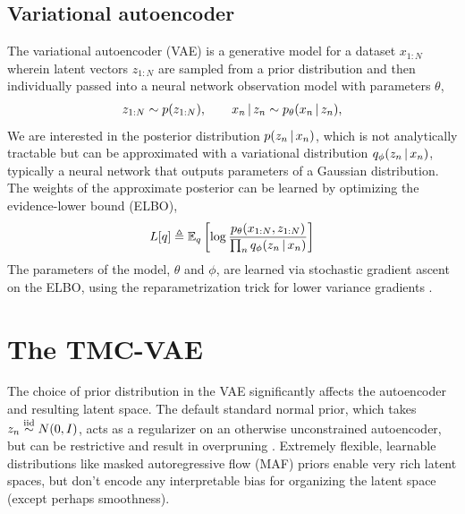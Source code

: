 \subsection{Variational autoencoder}
The variational autoencoder (VAE) is a generative model
for a dataset $x_{1:N}$
wherein latent vectors $z_{1:N}$ are sampled
from a prior distribution
and then individually passed into
a neural network observation model with parameters $\theta$,
\begin{equation}
    \begin{split}
        z_{1:N} \sim p(z_{1:N}),
        \qquad
        x_n \,|\, z_n \sim p_\theta(x_n \,|\, z_n),
    \end{split}
\end{equation}
We are interested in the posterior distribution
$p(z_n \,|\, x_n)$, which is not analytically tractable
but can be approximated with a variational distribution
$q_\phi(z_n \,|\, x_n)$, typically a neural network
that outputs parameters of a Gaussian distribution.
The weights of the approximate posterior can be learned
by optimizing the evidence-lower bound (ELBO),
\begin{equation}
    \begin{split}
    L[q] &\triangleq \mathbb{E}_q \left[\log \frac{p_\theta(x_{1:N}, z_{1:N})}{\prod_n q_\phi(z_n \,|\, x_n)}\right] \\
    \end{split}
\end{equation}
The parameters of the model, $\theta$ and $\phi$,
are learned via stochastic gradient ascent on
the ELBO, using the reparametrization trick
for lower variance gradients \citep{kingma2013autoencoding, rezende2014stochastic}.

\section{The TMC-VAE}
\label{sec:tmc-vae}

The choice of prior distribution in the VAE significantly affects the autoencoder and resulting latent space.
The default standard normal prior, which takes $z_n \stackrel{\mathrm{iid}}{\sim} N(0, I)$, acts as a regularizer on an otherwise unconstrained autoencoder, but can be restrictive and result in overpruning \citep{burda2015importance}.
Extremely flexible, learnable distributions like masked autoregressive flow (MAF) priors \citep{papamakarios2017masked} enable very rich latent spaces, but don't encode any interpretable bias for organizing the latent space (except perhaps smoothness).


